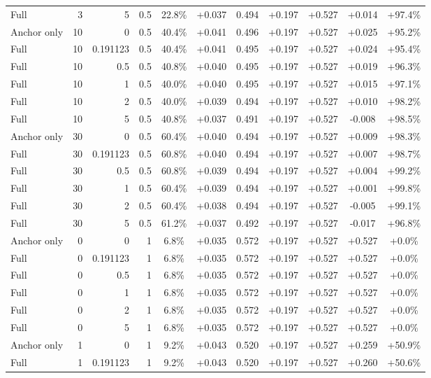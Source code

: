 \begin{table}[htbp]
\begin{tabular}{lrrrccccccc}
Full & 3 & 5 & 0.5 & 22.8\% & +0.037 & 0.494 & +0.197 & +0.527 & +0.014 & +97.4\% \\
Anchor only & 10 & 0 & 0.5 & 40.4\% & +0.041 & 0.496 & +0.197 & +0.527 & +0.025 & +95.2\% \\
Full & 10 & 0.191123 & 0.5 & 40.4\% & +0.041 & 0.495 & +0.197 & +0.527 & +0.024 & +95.4\% \\
Full & 10 & 0.5 & 0.5 & 40.8\% & +0.040 & 0.495 & +0.197 & +0.527 & +0.019 & +96.3\% \\
Full & 10 & 1 & 0.5 & 40.0\% & +0.040 & 0.495 & +0.197 & +0.527 & +0.015 & +97.1\% \\
Full & 10 & 2 & 0.5 & 40.0\% & +0.039 & 0.494 & +0.197 & +0.527 & +0.010 & +98.2\% \\
Full & 10 & 5 & 0.5 & 40.8\% & +0.037 & 0.491 & +0.197 & +0.527 & -0.008 & +98.5\% \\
Anchor only & 30 & 0 & 0.5 & 60.4\% & +0.040 & 0.494 & +0.197 & +0.527 & +0.009 & +98.3\% \\
Full & 30 & 0.191123 & 0.5 & 60.8\% & +0.040 & 0.494 & +0.197 & +0.527 & +0.007 & +98.7\% \\
Full & 30 & 0.5 & 0.5 & 60.8\% & +0.039 & 0.494 & +0.197 & +0.527 & +0.004 & +99.2\% \\
Full & 30 & 1 & 0.5 & 60.4\% & +0.039 & 0.494 & +0.197 & +0.527 & +0.001 & +99.8\% \\
Full & 30 & 2 & 0.5 & 60.4\% & +0.038 & 0.494 & +0.197 & +0.527 & -0.005 & +99.1\% \\
Full & 30 & 5 & 0.5 & 61.2\% & +0.037 & 0.492 & +0.197 & +0.527 & -0.017 & +96.8\% \\
Anchor only & 0 & 0 & 1 & 6.8\% & +0.035 & 0.572 & +0.197 & +0.527 & +0.527 & +0.0\% \\
Full & 0 & 0.191123 & 1 & 6.8\% & +0.035 & 0.572 & +0.197 & +0.527 & +0.527 & +0.0\% \\
Full & 0 & 0.5 & 1 & 6.8\% & +0.035 & 0.572 & +0.197 & +0.527 & +0.527 & +0.0\% \\
Full & 0 & 1 & 1 & 6.8\% & +0.035 & 0.572 & +0.197 & +0.527 & +0.527 & +0.0\% \\
Full & 0 & 2 & 1 & 6.8\% & +0.035 & 0.572 & +0.197 & +0.527 & +0.527 & +0.0\% \\
Full & 0 & 5 & 1 & 6.8\% & +0.035 & 0.572 & +0.197 & +0.527 & +0.527 & +0.0\% \\
Anchor only & 1 & 0 & 1 & 9.2\% & +0.043 & 0.520 & +0.197 & +0.527 & +0.259 & +50.9\% \\
Full & 1 & 0.191123 & 1 & 9.2\% & +0.043 & 0.520 & +0.197 & +0.527 & +0.260 & +50.6\% \\

\end{tabular}
\end{table}
